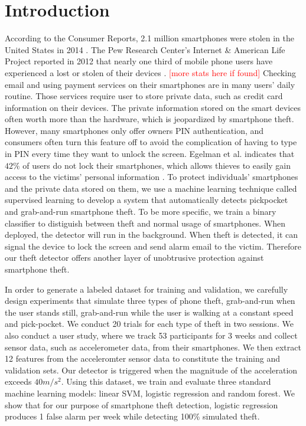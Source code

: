 \documentclass{soups}
\begin{document}
\section{Introduction}
According to the Consumer Reports, 2.1 million smartphones were stolen in the United States in 2014 \cite{deitrick:consumer}. The Pew Research Center's Internet \& American Life Project reported in 2012 that nearly one third of mobile phone users have experienced a lost or stolen of their devices \cite{boyles:pew}. \textcolor{red}{[more stats here if found]} Checking email and using payment services on their smartphones are in many users' daily routine. Those services require user to store private data, such as credit card information on their devices. The private information stored on the smart devices often worth more than the hardware, which is jeopardized by smartphone theft. However, many smartphones only offer owners PIN authentication, and consumers often turn this feature off to avoid the complication of having to type in PIN every time they want to unlock the screen. Egelman et al. indicates that $42\%$ of users do not lock their smartphones, which allows thieves to easily gain access to the victims' personal information \cite{egelman:lock}. To protect individuals' smartphones and the private data stored on them, we use a machine learning technique called supervised learning to develop a system that automatically detects pickpocket and grab-and-run smartphone theft. To be more specific, we train a binary classifier to distiguish between theft and normal usage of smartphones. When deployed, the detector will run in the background. When theft is detected, it can signal the device to lock the screen and send alarm email to the victim. Therefore our theft detector offers another layer of unobtrusive protection against smartphone theft.

In order to generate a labeled dataset for training and validation, we carefully design experiments that simulate three types of phone theft, grab-and-run when the user stands still, grab-and-run while the user is walking at a constant speed and pick-pocket. We conduct 20 trials for each type of theft in two sessions. We also conduct a user study, where we track 53 participants for 3 weeks and collect sensor data, such as accelerometer data, from their smartphones. We then extract 12 features from the acceleromter sensor data to constitute the training and validation sets. Our detector is triggered when the magnitude of the acceleration exceeds $40m/s^2$. Using this dataset, we train and evaluate three standard machine learning models: linear SVM, logistic regression and random forest. We show that for our purpose of smartphone theft detection, logistic regression produces 1 false alarm per week while detecting 100\% simulated theft.
\end{document}
